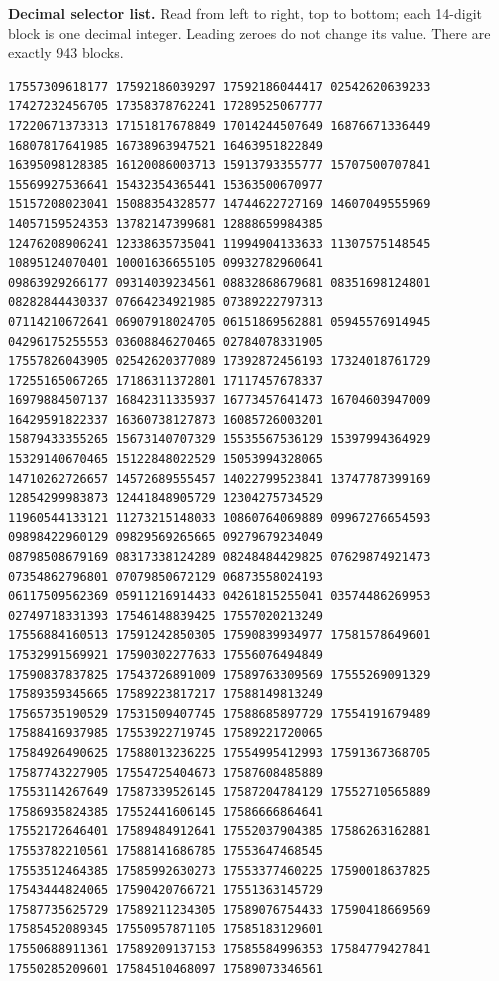 \documentclass[10pt]{article}
\begin{document}
\textbf{Decimal selector list.} Read from left to right, top to bottom;
each 14-digit block is one decimal integer. Leading zeroes do not change its
value. There are exactly 943 blocks.
\begin{verbatim}
17557309618177 17592186039297 17592186044417 02542620639233 17427232456705 17358378762241 17289525067777
17220671373313 17151817678849 17014244507649 16876671336449 16807817641985 16738963947521 16463951822849
16395098128385 16120086003713 15913793355777 15707500707841 15569927536641 15432354365441 15363500670977
15157208023041 15088354328577 14744622727169 14607049555969 14057159524353 13782147399681 12888659984385
12476208906241 12338635735041 11994904133633 11307575148545 10895124070401 10001636655105 09932782960641
09863929266177 09314039234561 08832868679681 08351698124801 08282844430337 07664234921985 07389222797313
07114210672641 06907918024705 06151869562881 05945576914945 04296175255553 03608846270465 02784078331905
17557826043905 02542620377089 17392872456193 17324018761729 17255165067265 17186311372801 17117457678337
16979884507137 16842311335937 16773457641473 16704603947009 16429591822337 16360738127873 16085726003201
15879433355265 15673140707329 15535567536129 15397994364929 15329140670465 15122848022529 15053994328065
14710262726657 14572689555457 14022799523841 13747787399169 12854299983873 12441848905729 12304275734529
11960544133121 11273215148033 10860764069889 09967276654593 09898422960129 09829569265665 09279679234049
08798508679169 08317338124289 08248484429825 07629874921473 07354862796801 07079850672129 06873558024193
06117509562369 05911216914433 04261815255041 03574486269953 02749718331393 17546148839425 17557020213249
17556884160513 17591242850305 17590839934977 17581578649601 17532991569921 17590302277633 17556076494849
17590837837825 17543726891009 17589763309569 17555269091329 17589359345665 17589223817217 17588149813249
17565735190529 17531509407745 17588685897729 17554191679489 17588416937985 17553922719745 17589221720065
17584926490625 17588013236225 17554995412993 17591367368705 17587743227905 17554725404673 17587608485889
17553114267649 17587339526145 17587204784129 17552710565889 17586935824385 17552441606145 17586666864641
17552172646401 17589484912641 17552037904385 17586263162881 17553782210561 17588141686785 17553647468545
17553512464385 17585992630273 17553377460225 17590018637825 17543444824065 17590420766721 17551363145729
17587735625729 17589211234305 17589076754433 17590418669569 17585452089345 17550957871105 17585183129601
17550688911361 17589209137153 17585584996353 17584779427841 17550285209601 17584510468097 17589073346561

\end{verbatim}
\end{document}
